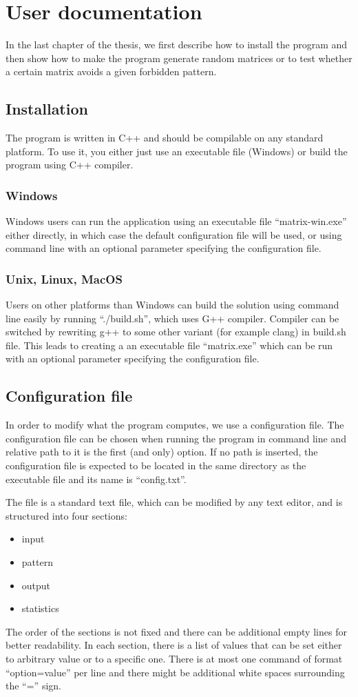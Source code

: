 \chapter{User documentation}
\label{chap:udoc}
In the last chapter of the thesis, we first describe how to install the program and then show how to make the program generate random matrices or to test whether a certain matrix avoids a given forbidden pattern.

\section{Installation}
The program is written in C++ and should be compilable on any standard platform. To use it, you either just use an executable file (Windows) or build the program using C++ compiler.

\subsection{Windows}
Windows users can run the application using an executable file ``matrix-win.exe'' either directly, in which case the default configuration file will be used, or using command line with an optional parameter specifying the configuration file.

\subsection{Unix, Linux, MacOS}
Users on other platforms than Windows can build the solution using command line easily by running ``./build.sh'', which uses G++ compiler. Compiler can be switched by rewriting g++ to some other variant (for example clang) in build.sh file. This leads to creating a an executable file ``matrix.exe'' which can be run with an optional parameter specifying the configuration file.

\section{Configuration file}
In order to modify what the program computes, we use a configuration file. The configuration file can be chosen when running the program in command line and relative path to it is the first (and only) option. If no path is inserted, the configuration file is expected to be located in the same directory as the executable file and its name is ``config.txt''.

The file is a standard text file, which can be modified by any text editor, and is structured into four sections:
\begin{itemize}
\item input
\item pattern
\item output
\item statistics
\end{itemize}
The order of the sections is not fixed and there can be additional empty lines for better readability. In each section, there is a list of values that can be set either to arbitrary value or to a specific one. There is at most one command of format ``option=value'' per line and there might be additional white spaces surrounding the ``='' sign.

